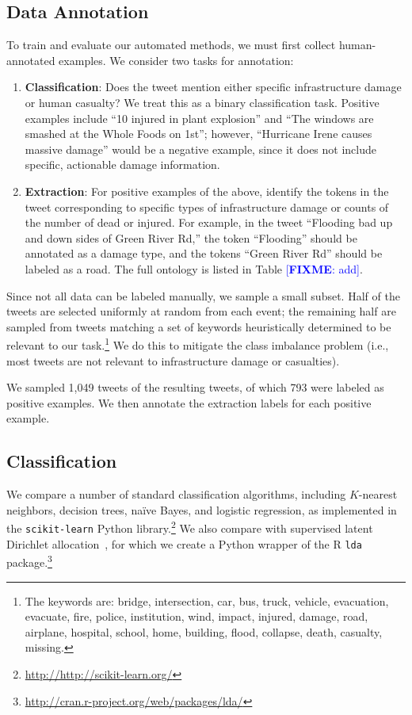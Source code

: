 \documentclass{article}
\newcommand{\FIXME}[1]{\textcolor{blue}{[\textbf{FIXME}: {#1}]}}
\begin{document}
\subsection{Data Annotation}
To train and evaluate our automated methods, we must first collect
human-annotated examples. We consider two tasks for annotation:
\begin{enumerate}
  \item {\bf Classification}: Does the tweet mention either specific
    infrastructure damage or human casualty? We treat this as a binary
    classification task. Positive examples include ``10 injured in plant
    explosion'' and ``The windows are smashed at the Whole Foods on 1st'';
    however, ``Hurricane Irene causes massive damage'' would be a negative
    example, since it does not include specific, actionable damage
    information.
  \item {\bf Extraction}: For positive examples of the above, identify the
    tokens in the tweet corresponding to specific types of infrastructure
    damage or counts of the number of dead or injured. For example, in the
    tweet ``Flooding bad up and down sides of Green River Rd,'' the token
    ``Flooding'' should be annotated as a damage type, and the tokens ``Green
    River Rd'' should be labeled as a road. The full ontology is listed in
    Table \FIXME{add}.
\end{enumerate}

Since not all data can be labeled manually, we sample a small subset. Half of
the tweets are selected uniformly at random from each event; the remaining
half are sampled from tweets matching a set of keywords heuristically
determined to be relevant to our task.\footnote{The keywords are: bridge,
  intersection, car, bus, truck, vehicle, evacuation, evacuate, fire, police,
  institution, wind, impact, injured, damage, road, airplane, hospital,
  school, home, building, flood, collapse, death, casualty, missing.} We do
this to mitigate the class imbalance problem (i.e., most tweets are not
relevant to infrastructure damage or casualties).

We sampled 1,049 tweets of the resulting tweets, of which 793 were labeled as
positive examples. We then annotate the extraction labels for each positive
example.


\subsection{Classification}
We compare a number of standard classification algorithms, including
$K$-nearest neighbors, decision trees, na\"ive Bayes, and logistic regression,
as implemented in the {\tt scikit-learn} Python
library.\footnote{\url{http://http://scikit-learn.org/}} We also compare with
supervised latent Dirichlet allocation~\cite{blei10supervised}, for which we create a Python wrapper of the R {\tt lda} package.\footnote{\url{http://cran.r-project.org/web/packages/lda/}}
\end{document}
